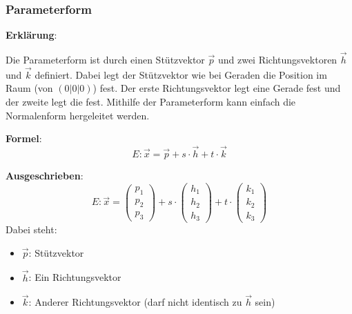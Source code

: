 
\subsubsection{Parameterform}
\textbf{Erklärung}: 

Die Parameterform ist durch einen Stützvektor $\vec{p}$ und zwei Richtungsvektoren $\vec{h}$ und $\vec{k}$ definiert. 
Dabei legt der Stützvektor wie bei Geraden die Position im Raum (von $(0|0|0)$) fest. 
Der erste Richtungsvektor legt eine Gerade fest und der zweite legt die fest.
Mithilfe der Parameterform kann einfach die Normalenform hergeleitet werden.

\textbf{Formel}: 
\[
E: \vec{x} = \vec{p} + s\cdot\vec{h} + t\cdot\vec{k}
\]

\textbf{Ausgeschrieben}: 
\[
E: \vec{x} = 
\begin{pmatrix}
    p_1 \\ p_2 \\ p_3
\end{pmatrix}
 + s \cdot
\begin{pmatrix}
    h_1 \\ h_2 \\ h_3
\end{pmatrix}
 + t \cdot 
 \begin{pmatrix}
    k_1 \\ k_2 \\ k_3
 \end{pmatrix}
\]
Dabei steht:
\begin{itemize}
    \item $\vec{p}$: Stützvektor
    \item $\vec{h}$: Ein Richtungsvektor
    \item $\vec{k}$: Anderer Richtungsvektor (darf nicht identisch zu $\vec{h}$ sein)
\end{itemize}
